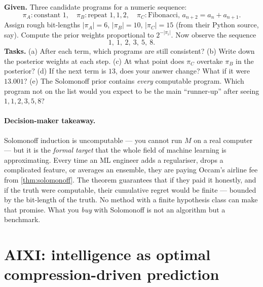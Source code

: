 \documentclass[12pt,a4paper]{article}
\theoremstyle{plain}
\theoremstyle{definition}
\begin{document}
\begin{activity}[title={Worksheet: which program survives?}]
\label{act:fibonacci-worksheet}
\textbf{Given.}  Three candidate programs for a numeric sequence:
\[
  \pi_A : \text{constant }1,\quad
  \pi_B : \text{repeat }1,1,2,\quad
  \pi_C : \text{Fibonacci, } a_{n+2}=a_n+a_{n+1}.
\]
Assign rough bit-lengths $|\pi_A|=6$, $|\pi_B|=10$, $|\pi_C|=15$ (from
their Python source, say).  Compute the prior weights proportional to
$2^{-|\pi_i|}$.  Now observe the sequence
\[
  1,\ 1,\ 2,\ 3,\ 5,\ 8.
\]
\textbf{Tasks.}  (a) After each term, which programs are still
consistent?  (b) Write down the posterior weights at each step.
(c) At what point does $\pi_C$ overtake $\pi_B$ in the posterior?
(d) If the next term is $13$, does your answer change?  What if it
were $13.001$?  (e) The Solomonoff prior contains \emph{every}
computable program.  Which program not on the list would you expect
to be the main ``runner-up'' after seeing $1,1,2,3,5,8$?
\end{activity}

\paragraph{Decision-maker takeaway.}  Solomonoff induction is
uncomputable --- you cannot run $M$ on a real computer --- but it is
the \emph{formal target} that the whole field of machine learning is
approximating.  Every time an ML engineer adds a regulariser, drops
a complicated feature, or averages an ensemble, they are paying
Occam's airline fee from \cref{thm:solomonoff}.  The theorem
guarantees that if they paid it honestly, and if the truth were
computable, their cumulative regret would be finite --- bounded by
the bit-length of the truth.  No method with a finite hypothesis
class can make that promise.  What you \emph{buy} with Solomonoff is
not an algorithm but a benchmark.



\section{AIXI: intelligence as optimal compression-driven prediction}
\label{sec:aixi}
\end{document}
